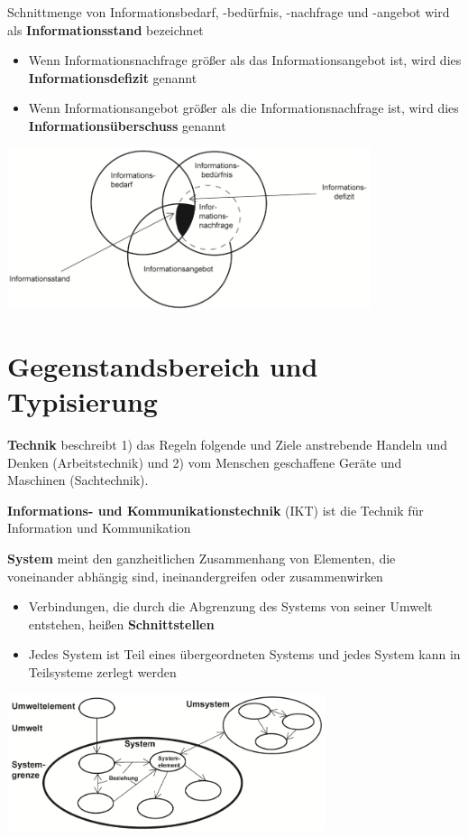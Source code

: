 Schnittmenge von Informationsbedarf, -bedürfnis, -nachfrage und -angebot wird als \textbf{Informationsstand} bezeichnet
\begin{itemize}
	\item Wenn Informationsnachfrage größer als das Informationsangebot ist, wird dies \textbf{Informationsdefizit} genannt
	\item Wenn Informationsangebot größer als die Informationsnachfrage ist, wird dies \textbf{Informationsüberschuss} genannt
\end{itemize}
\begin{center}
	\includegraphics[width=0.8\textwidth]{images/infodefizit.png}
\end{center}

\section{Gegenstandsbereich und Typisierung}
\textbf{Technik} beschreibt 1) das Regeln folgende und Ziele anstrebende Handeln und Denken (Arbeitstechnik) und 2) vom Menschen geschaffene Geräte und Maschinen (Sachtechnik).

\textbf{Informations- und Kommunikationstechnik} (IKT) ist die Technik für Information und Kommunikation

\textbf{System} meint den ganzheitlichen Zusammenhang von Elementen, die voneinander abhängig sind, ineinandergreifen oder zusammenwirken
\begin{itemize}
	\item Verbindungen, die durch die Abgrenzung des Systems von seiner Umwelt entstehen, heißen \textbf{Schnittstellen}
	\item Jedes System ist Teil eines übergeordneten Systems und jedes System kann in Teilsysteme zerlegt werden
\end{itemize}
\begin{center}
	\includegraphics[width=0.7\textwidth]{images/system.png}
\end{center}

